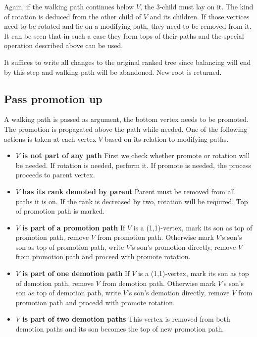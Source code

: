 Again, if the walking path continues below $V$, the 3-child must lay on it. The kind of rotation is deduced from the other child of $V$ and its children. If those vertices need to be rotated and lie on a modifying path, they need to be removed from it. It can be seen that in such a case they form tops of their paths and the special operation described above can be used.

It suffices to write all changes to the original ranked tree since balancing will end by this step and walking path will be abandoned. New root is returned.

\subsection{Pass promotion up}

A walking path is passed as argument, the bottom vertex needs to be promoted. The promotion is propagated above the path while needed. One of the following actions is taken at each vertex $V$ based on its relation to modifying paths.

\begin{itemize}

\item {\bfseries $V$ is not part of any path} First we check whether promote or rotation will be needed. If rotation is needed, perform it. If promote is needed, the process proceeds to parent vertex.

\item {\bfseries $V$ has its rank demoted by parent} Parent must be removed from all paths it is on. If the rank is decreased by two, rotation will be required. Top of promotion path is marked.

\item {\bfseries $V$ is part of a promotion path} If $V$ is a (1,1)-vertex, mark its son as top of promotion path, remove $V$ from promotion path. Otherwise mark $V$'s son's son as top of promotion path, write $V$'s son's promotion directly, remove $V$ from promotion path and proceed with promote rotation. 

\item {\bfseries $V$ is part of one demotion path} If $V$ is a (1,1)-vertex, mark its son as top of demotion path, remove $V$ from demotion path. Otherwise mark $V$'s son's son as top of demotion path, write $V$'s son's demotion directly, remove $V$ from promotion path and procedd with promote rotation.

\item {\bfseries $V$ is part of two demotion paths} This vertex is removed from both demotion paths and its son becomes the top of new promotion path.

\end{itemize}


